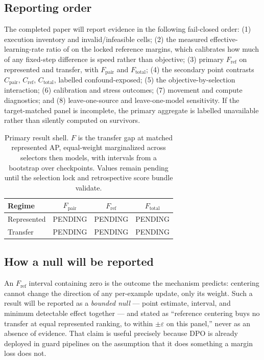 \subsection{Reporting order}

The completed paper will report evidence in the following fail-closed order:
(1) execution inventory and invalid/infeasible cells; (2) the measured
effective-learning-rate ratio of  on the locked reference
margins, which calibrates how much of any fixed-step difference is speed rather
than objective; (3) primary $F_{\mathrm{ref}}$ on represented and transfer, with
$F_{\mathrm{pair}}$ and $F_{\mathrm{total}}$; (4) the secondary point contrasts
$C_{\mathrm{pair}}$, $C_{\mathrm{ref}}$, $C_{\mathrm{total}}$, labelled
confound-exposed; (5) the objective-by-selection interaction; (6) calibration and
stress outcomes; (7) movement and compute diagnostics; and (8) leave-one-source
and leave-one-model sensitivity. If the target-matched panel is incomplete, the
primary aggregate is labelled unavailable rather than silently computed on
survivors.

\begin{table}[h]
\centering
\caption{Primary result shell. $F$ is the transfer gap at matched represented AP,
equal-weight marginalized across selectors then models, with intervals from a
bootstrap over checkpoints. Values remain pending until the selection lock and
retrospective score bundle validate.}
\begin{tabular}{lccc}
\toprule
Regime & $F_{\mathrm{pair}}$ & $F_{\mathrm{ref}}$ & $F_{\mathrm{total}}$\\
\midrule
Represented & PENDING & PENDING & PENDING\\
Transfer    & PENDING & PENDING & PENDING\\
\bottomrule
\end{tabular}
\end{table}

\subsection{How a null will be reported}

An $F_{\mathrm{ref}}$ interval containing zero is the outcome the mechanism
predicts: centering cannot change the direction of any per-example update, only
its weight. Such a result will be reported as a \emph{bounded null} --- point
estimate, interval, and minimum detectable effect together --- and stated as
``reference centering buys no transfer at equal represented ranking, to within
$\pm\varepsilon$ on this panel,'' never as an absence of evidence. That claim is
useful precisely because DPO is already deployed in guard pipelines on the
assumption that it does something a margin loss does not.
